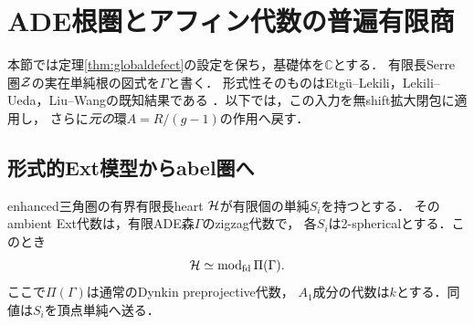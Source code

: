 \section{ADE根圏とアフィン代数の普遍有限商}\label{sec:ADEquotient}
本節では定理\ref{thm:globaldefect}の設定を保ち，基礎体を$\mathbb C$とする．
有限長Serre圏$\mathcal Z$の実在単純根の図式を$\Gamma$と書く．
形式性そのものはEtg\"u--Lekili，Lekili--Ueda，Liu--Wangの既知結果である
\cite[Theorem 1.1]{LiuWangZigzag}．以下では，この入力を無shift拡大閉包に適用し，
さらに\emph{元の}環$A=R/(g-1)$の作用へ戻す．

\subsection{形式的Ext模型からabel圏へ}
\begin{lemma}[無shift拡大閉包の認識]\label{lem:formal-ADE-heart}
enhanced三角圏の有界有限長heart $\mathcal H$が有限個の単純$S_i$を持つとする．
そのambient Ext代数は，有限ADE森$\Gamma$のzigzag代数で，
各$S_i$は2-sphericalとする．このとき
\[
 \mathcal H\simeq\operatorname{mod}_{\rm fd}\Pi(\Gamma).
\]
ここで$\Pi(\Gamma)$は通常のDynkin preprojective代数，
$A_1$成分の代数は$k$とする．同値は$S_i$を頂点単純へ送る．
\end{lemma}
